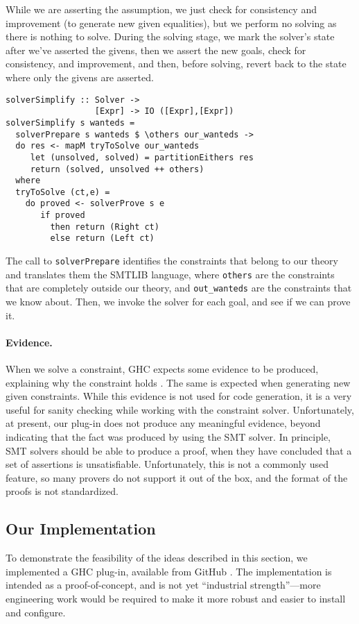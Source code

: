 \documentclass{sigplanconf}
\begin{document}
While we are asserting the assumption, we just check for consistency
and improvement (to generate new given equalities), but we perform
no solving as there is nothing to solve.  During the solving stage,
we mark the solver's state after we've asserted the givens,
then we assert the new goals, check for consistency, and improvement,
and then, before solving, revert back to the state where only
the givens are asserted.
\begin{Verbatim}
solverSimplify :: Solver ->
                  [Expr] -> IO ([Expr],[Expr])
solverSimplify s wanteds =
  solverPrepare s wanteds $ \others our_wanteds ->
  do res <- mapM tryToSolve our_wanteds
     let (unsolved, solved) = partitionEithers res
     return (solved, unsolved ++ others)
  where
  tryToSolve (ct,e) =
    do proved <- solverProve s e
       if proved
         then return (Right ct)
         else return (Left ct)
\end{Verbatim}
The call to \verb"solverPrepare" identifies the constraints that belong
to our theory and translates them the SMTLIB language, where \Verb"others"
are the constraints that are completely outside our theory, and
\Verb"out_wanteds" are the constraints that we know about. Then,
we invoke the solver for each goal, and see if we can prove it.

\paragraph{Evidence.} When we solve a constraint, GHC expects some
evidence to be produced, explaining why the constraint holds
\cite{fc-evidence}.  The same is expected when generating new given
constraints.  While this evidence is not used for code generation,
it is a very useful for sanity checking while working with the constraint
solver.  Unfortunately, at present, our plug-in does not produce any
meaningful evidence, beyond indicating that the fact was produced
by using the SMT solver. In principle, SMT solvers should be able to
produce a proof, when they have concluded that a set of assertions
is unsatisfiable.  Unfortunately, this is not a commonly used feature,
so many provers do not support it out of the box, and the format of the
proofs is not standardized.


\subsection{Our Implementation}
\label{implementation}

To demonstrate the feasibility of the ideas described in this section,
we implemented a GHC plug-in, available from GitHub \cite{type-nats-solver}.
The implementation is intended as a proof-of-concept, and is not
yet ``industrial strength''---more engineering work would be required
to make it more robust and easier to install and configure.
\end{document}
